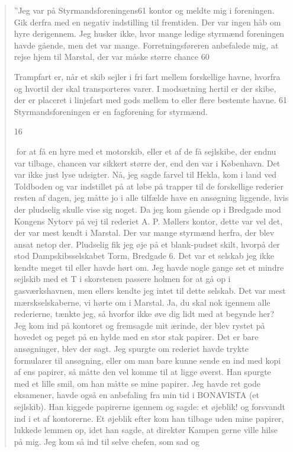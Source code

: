 \begin{quote}
''Jeg var på Styrmandsforeningens61
kontor og meldte mig i foreningen. Gik derfra med en negativ indstilling
til fremtiden. Der var ingen håb om hyre derigennem. Jeg husker ikke,
hvor mange ledige styrmænd foreningen havde gående, men det var mange.
Forretningsføreren anbefalede mig, at rejse hjem til Marstal, der var
måske større chance 60

Trampfart er, når et skib sejler i fri fart mellem forskellige havne,
hvorfra og hvortil der skal transporteres varer. I modsætning hertil er
der skibe, der er placeret i linjefart med gods mellem to eller flere
bestemte havne. 61 Styrmandsforeningen er en fagforening for styrmænd.

16

for at få en hyre med et motorskib, eller et af de få sejlskibe, der
endnu var tilbage, chancen var sikkert større der, end den var i
København. Det var ikke just lyse udsigter. Nå, jeg sagde farvel til
Hekla, kom i land ved Toldboden og var indstillet på at løbe på trapper
til de forskellige rederier resten af dagen, jeg måtte jo i alle
tilfælde have en ansøgning liggende, hvis der pludselig skulle vise sig
noget. Da jeg kom gående op i Bredgade mod Kongens Nytorv på vej til
rederiet A. P. Møllers kontor, dette var vel det, der var mest kendt i
Marstal. Der var mange styrmænd herfra, der blev ansat netop der.
Pludselig fik jeg øje på et blank-pudset skilt, hvorpå der stod
Dampskibsselskabet Torm, Bredgade 6. Det var et selskab jeg ikke kendte
meget til eller havde hørt om. Jeg havde nogle gange set et mindre
sejlskib med et T i skorstenen passere holmen for at gå op i
gasværkshavnen, men ellers kendte jeg intet til dette selskab. Det var
mest mærskselskaberne, vi hørte om i Marstal. Ja, du skal nok igennem
alle rederierne, tænkte jeg, så hvorfor ikke øve dig lidt med at begynde
her? Jeg kom ind på kontoret og fremsagde mit ærinde, der blev rystet på
hovedet og peget på en hylde med en stor stak papirer. Det er bare
ansøgninger, blev der sagt. Jeg spurgte om rederiet havde trykte
formularer til ansøgning, eller om man bare kunne sende en ind med kopi
af ens papirer, så måtte den vel komme til at ligge øverst. Han spurgte
med et lille smil, om han måtte se mine papirer. Jeg havde ret gode
eksamener, havde også en anbefaling fra min tid i BONAVISTA (et
sejlskib). Han kiggede papirerne igennem og sagde: et øjeblik! og
forsvandt ind i et af kontorerne. Et øjeblik efter kom han tilbage uden
mine papirer, lukkede lemmen op, idet han sagde, at direktør Kampen
gerne ville hilse på mig. Jeg kom så ind til selve chefen, som sad og

\end{quote}

